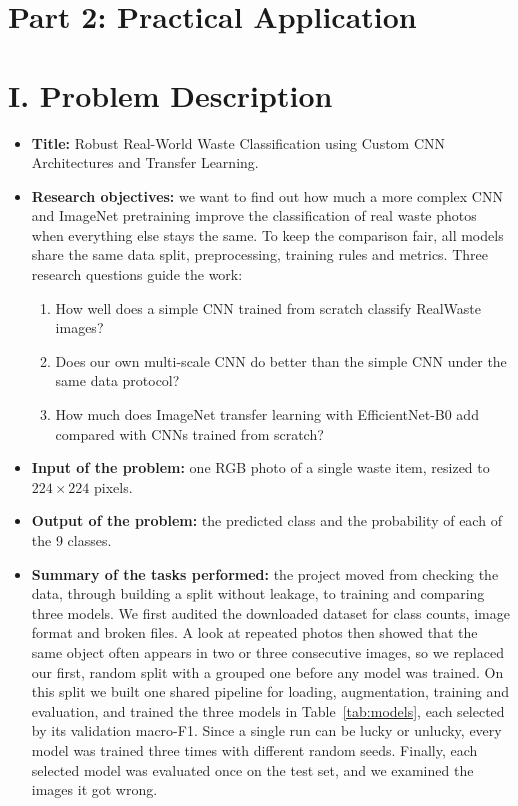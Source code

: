 \documentclass{article}
\newcommand{\topic}{Robust Real-World Waste Classification using Custom CNN Architectures and Transfer Learning}
\begin{document}
\section{Part 2: Practical Application}

\section{I. Problem Description}

\begin{itemize}
  \item \textbf{Title:} \topic.
  \item \textbf{Research objectives:} we want to find out how much a more complex CNN and ImageNet pretraining improve the classification of real waste photos when everything else stays the same. To keep the comparison fair, all models share the same data split, preprocessing, training rules and metrics. Three research questions guide the work:
  \begin{enumerate}[label=RQ\arabic*., leftmargin=1.4cm]
    \item How well does a simple CNN trained from scratch classify RealWaste images?
    \item Does our own multi-scale CNN do better than the simple CNN under the same data protocol?
    \item How much does ImageNet transfer learning with EfficientNet-B0 add compared with CNNs trained from scratch?
  \end{enumerate}
  \item \textbf{Input of the problem:} one RGB photo of a single waste item, resized to $224\times224$ pixels.
  \item \textbf{Output of the problem:} the predicted class and the probability of each of the 9 classes.
  \item \textbf{Summary of the tasks performed:} the project moved from checking the data, through building a split without leakage, to training and comparing three models. We first audited the downloaded dataset for class counts, image format and broken files. A look at repeated photos then showed that the same object often appears in two or three consecutive images, so we replaced our first, random split with a grouped one before any model was trained. On this split we built one shared pipeline for loading, augmentation, training and evaluation, and trained the three models in Table~\ref{tab:models}, each selected by its validation macro-F1. Since a single run can be lucky or unlucky, every model was trained three times with different random seeds. Finally, each selected model was evaluated once on the test set, and we examined the images it got wrong.
\end{itemize}
\end{document}
